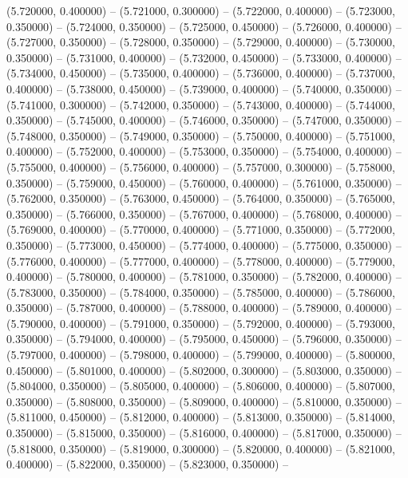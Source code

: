 (5.720000, 0.400000) -- 
(5.721000, 0.300000) -- 
(5.722000, 0.400000) -- 
(5.723000, 0.350000) -- 
(5.724000, 0.350000) -- 
(5.725000, 0.450000) -- 
(5.726000, 0.400000) -- 
(5.727000, 0.350000) -- 
(5.728000, 0.350000) -- 
(5.729000, 0.400000) -- 
(5.730000, 0.350000) -- 
(5.731000, 0.400000) -- 
(5.732000, 0.450000) -- 
(5.733000, 0.400000) -- 
(5.734000, 0.450000) -- 
(5.735000, 0.400000) -- 
(5.736000, 0.400000) -- 
(5.737000, 0.400000) -- 
(5.738000, 0.450000) -- 
(5.739000, 0.400000) -- 
(5.740000, 0.350000) -- 
(5.741000, 0.300000) -- 
(5.742000, 0.350000) -- 
(5.743000, 0.400000) -- 
(5.744000, 0.350000) -- 
(5.745000, 0.400000) -- 
(5.746000, 0.350000) -- 
(5.747000, 0.350000) -- 
(5.748000, 0.350000) -- 
(5.749000, 0.350000) -- 
(5.750000, 0.400000) -- 
(5.751000, 0.400000) -- 
(5.752000, 0.400000) -- 
(5.753000, 0.350000) -- 
(5.754000, 0.400000) -- 
(5.755000, 0.400000) -- 
(5.756000, 0.400000) -- 
(5.757000, 0.300000) -- 
(5.758000, 0.350000) -- 
(5.759000, 0.450000) -- 
(5.760000, 0.400000) -- 
(5.761000, 0.350000) -- 
(5.762000, 0.350000) -- 
(5.763000, 0.450000) -- 
(5.764000, 0.350000) -- 
(5.765000, 0.350000) -- 
(5.766000, 0.350000) -- 
(5.767000, 0.400000) -- 
(5.768000, 0.400000) -- 
(5.769000, 0.400000) -- 
(5.770000, 0.400000) -- 
(5.771000, 0.350000) -- 
(5.772000, 0.350000) -- 
(5.773000, 0.450000) -- 
(5.774000, 0.400000) -- 
(5.775000, 0.350000) -- 
(5.776000, 0.400000) -- 
(5.777000, 0.400000) -- 
(5.778000, 0.400000) -- 
(5.779000, 0.400000) -- 
(5.780000, 0.400000) -- 
(5.781000, 0.350000) -- 
(5.782000, 0.400000) -- 
(5.783000, 0.350000) -- 
(5.784000, 0.350000) -- 
(5.785000, 0.400000) -- 
(5.786000, 0.350000) -- 
(5.787000, 0.400000) -- 
(5.788000, 0.400000) -- 
(5.789000, 0.400000) -- 
(5.790000, 0.400000) -- 
(5.791000, 0.350000) -- 
(5.792000, 0.400000) -- 
(5.793000, 0.350000) -- 
(5.794000, 0.400000) -- 
(5.795000, 0.450000) -- 
(5.796000, 0.350000) -- 
(5.797000, 0.400000) -- 
(5.798000, 0.400000) -- 
(5.799000, 0.400000) -- 
(5.800000, 0.450000) -- 
(5.801000, 0.400000) -- 
(5.802000, 0.300000) -- 
(5.803000, 0.350000) -- 
(5.804000, 0.350000) -- 
(5.805000, 0.400000) -- 
(5.806000, 0.400000) -- 
(5.807000, 0.350000) -- 
(5.808000, 0.350000) -- 
(5.809000, 0.400000) -- 
(5.810000, 0.350000) -- 
(5.811000, 0.450000) -- 
(5.812000, 0.400000) -- 
(5.813000, 0.350000) -- 
(5.814000, 0.350000) -- 
(5.815000, 0.350000) -- 
(5.816000, 0.400000) -- 
(5.817000, 0.350000) -- 
(5.818000, 0.350000) -- 
(5.819000, 0.300000) -- 
(5.820000, 0.400000) -- 
(5.821000, 0.400000) -- 
(5.822000, 0.350000) -- 
(5.823000, 0.350000) -- 

